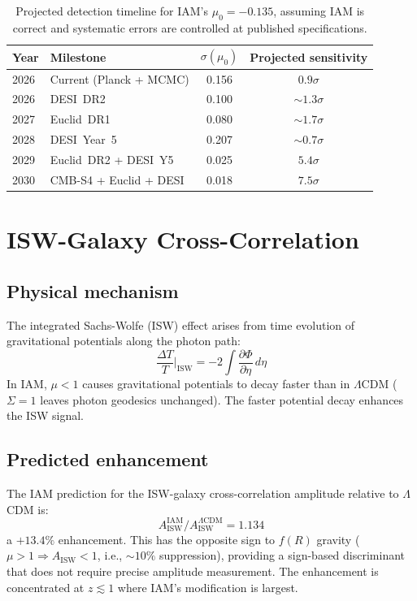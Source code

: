 \documentclass[12pt,a4paper]{article}
\begin{document}
\begin{table}[h]
\centering
\caption{Projected detection timeline for IAM's $\mu_0 = -0.135$, assuming IAM
is correct and systematic errors are controlled at published specifications.}
\label{tab:timeline}
\begin{tabular}{llcc}
\toprule
Year & Milestone & $\sigma(\mu_0)$ & Projected sensitivity \\
\midrule
2026 & Current (Planck + MCMC) & 0.156 & $0.9\sigma$ \\
2026 & DESI~DR2 & 0.100 & $\sim 1.3\sigma$ \\
2027 & Euclid~DR1 & 0.080 & $\sim 1.7\sigma$ \\
2028 & DESI~Year~5 & 0.207 & $\sim 0.7\sigma$ \\
2029 & Euclid~DR2 + DESI~Y5 & 0.025 & $5.4\sigma$ \\
2030 & CMB-S4 + Euclid + DESI & 0.018 & $7.5\sigma$ \\
\bottomrule
\end{tabular}
\end{table}

\section{ISW-Galaxy Cross-Correlation}

\subsection{Physical mechanism}

The integrated Sachs-Wolfe (ISW) effect arises from time evolution of
gravitational potentials along the photon path:
\begin{equation}
\frac{\Delta T}{T}\bigg|_\mathrm{ISW} = -2\int \frac{\partial\Phi}{\partial\eta}\,d\eta
\end{equation}
In IAM, $\mu < 1$ causes gravitational potentials to decay faster than in
$\Lambda$CDM ($\Sigma = 1$ leaves photon geodesics unchanged). The faster
potential decay enhances the ISW signal.

\subsection{Predicted enhancement}

The IAM prediction for the ISW-galaxy cross-correlation amplitude relative to
$\Lambda$CDM is:
\begin{equation}
A_\mathrm{ISW}^\mathrm{IAM} / A_\mathrm{ISW}^{\Lambda\mathrm{CDM}} = 1.134
\end{equation}
a $+13.4\%$ enhancement. This has the opposite sign to $f(R)$ gravity
($\mu > 1 \Rightarrow A_\mathrm{ISW} < 1$, i.e., $\sim 10\%$ suppression),
providing a sign-based discriminant that does not require precise amplitude
measurement. The enhancement is concentrated at $z \lesssim 1$ where IAM's
modification is largest.
\end{document}
